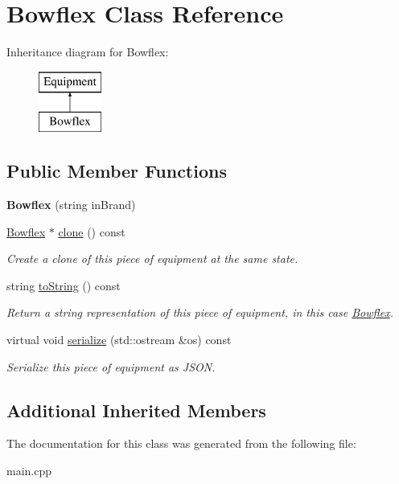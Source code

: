\hypertarget{class_bowflex}{}\section{Bowflex Class Reference}
\label{class_bowflex}
Inheritance diagram for Bowflex\+:\begin{figure}[H]
\begin{center}
\leavevmode
\includegraphics[height=2.000000cm]{class_bowflex}
\end{center}
\end{figure}
\subsection*{Public Member Functions}
\begin{DoxyCompactItemize}
\item 
\hypertarget{class_bowflex_aedb784e8d6845101938ec489f52627b7}{}{\bfseries Bowflex} (string in\+Brand)\label{class_bowflex_aedb784e8d6845101938ec489f52627b7}

\item 
\hypertarget{class_bowflex_a6a28e3b55ad31c4cc4df779d7f0377ab}{}\hyperlink{class_bowflex}{Bowflex} $\ast$ \hyperlink{class_bowflex_a6a28e3b55ad31c4cc4df779d7f0377ab}{clone} () const \label{class_bowflex_a6a28e3b55ad31c4cc4df779d7f0377ab}

\begin{DoxyCompactList}\small\item\em Create a clone of this piece of equipment at the same state. \end{DoxyCompactList}\item 
\hypertarget{class_bowflex_aa80bbb6167cbc96a85c4c251f7bd4322}{}string \hyperlink{class_bowflex_aa80bbb6167cbc96a85c4c251f7bd4322}{to\+String} () const \label{class_bowflex_aa80bbb6167cbc96a85c4c251f7bd4322}

\begin{DoxyCompactList}\small\item\em Return a string representation of this piece of equipment, in this case \textquotesingle{}\hyperlink{class_bowflex}{Bowflex}\textquotesingle{}. \end{DoxyCompactList}\item 
\hypertarget{class_bowflex_a6dacc10859384c1fb25f0832c63c5962}{}virtual void \hyperlink{class_bowflex_a6dacc10859384c1fb25f0832c63c5962}{serialize} (std\+::ostream \&os) const \label{class_bowflex_a6dacc10859384c1fb25f0832c63c5962}

\begin{DoxyCompactList}\small\item\em Serialize this piece of equipment as J\+S\+O\+N. \end{DoxyCompactList}\end{DoxyCompactItemize}
\subsection*{Additional Inherited Members}


The documentation for this class was generated from the following file\+:\begin{DoxyCompactItemize}
\item 
main.\+cpp\end{DoxyCompactItemize}
